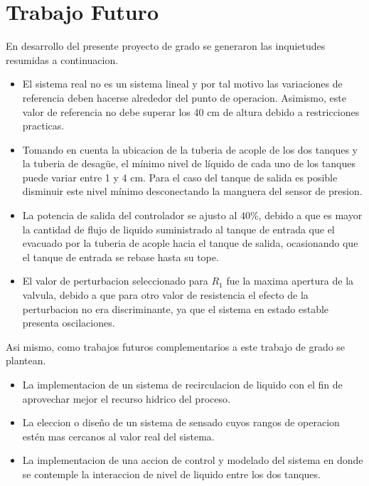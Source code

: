 \documentclass[a4paper,12pt,twoside]{proyectotanquesecci}
\begin{document}

\chapter{Trabajo Futuro}

En desarrollo del presente proyecto de grado se generaron las inquietudes resumidas a continuacion. \\

\begin{itemize}
\item El sistema real no es un sistema lineal y por tal motivo las variaciones de referencia deben hacerse alrededor del punto de operacion. Asimismo, este valor de referencia no debe superar los 40 cm de altura debido a restricciones practicas.
\item Tomando en cuenta la ubicacion de la tuberia de acople de los dos tanques y la tuberia de desag\"ue, el mínimo nivel de líquido de cada uno de los tanques puede variar entre 1 y 4 cm. Para el caso del tanque de salida es posible disminuir este nivel mínimo desconectando la manguera del sensor de presion.
\item La potencia de salida del controlador se ajusto al 40\%, debido a que es mayor la cantidad de flujo de liquido suministrado al tanque de entrada que el evacuado por la tuberia de acople hacia el tanque de salida, ocasionando que el tanque de entrada se rebase hasta su tope.
\item El valor de perturbacion seleccionado para $R_{1}$ fue la maxima apertura de la valvula, debido a que para otro valor de resistencia el efecto de la perturbacion no era discriminante, ya que el sistema en estado estable presenta oscilaciones.
\end{itemize}

Asi mismo, como trabajos futuros complementarios a este trabajo de grado se plantean. \\

\begin{itemize}
\item La implementacion de un sistema de recirculacion de liquido con el fin de aprovechar mejor el recurso hidrico del proceso.
\item La eleccion o diseño de un sistema de sensado cuyos rangos de operacion estén mas cercanos al valor real del sistema.
\item La implementacion de una accion de control y modelado del sistema en donde se contemple la interaccion de nivel de liquido entre los dos tanques.
\end{itemize}
\end{document}
